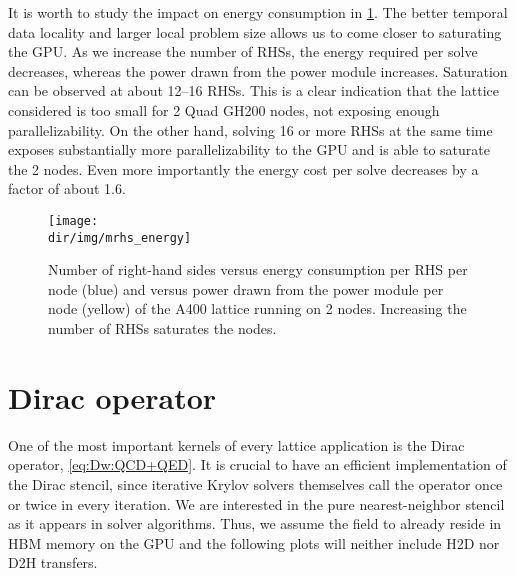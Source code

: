 It is worth to study the impact on energy consumption in \cref{fig:mrhs:energy}.
The better temporal data locality and larger local problem size allows us to come closer to saturating the GPU.
As we increase the number of RHSs, the energy required per solve decreases, whereas the power drawn from the power module increases.
Saturation can be observed at about \numrange{12}{16} RHSs.
This is a clear indication that the lattice considered is too small for \num{2} Quad GH200 nodes, not exposing enough parallelizability.
On the other hand, solving \num{16} or more RHSs at the same time exposes substantially more parallelizability to the GPU and is able to saturate the \num{2} nodes.
Even more importantly the energy cost per solve decreases by a factor of about \num{1.6}.
\begin{figure}
    \centering
    \texttt{[image: \\dir/img/mrhs\_energy]}
    \caption{Number of right-hand sides versus energy consumption per RHS per node (blue) and versus power drawn from the power module per node (yellow) of the A400 lattice running on 2 nodes. Increasing the number of RHSs saturates the nodes. }
    \label{fig:mrhs:energy}
\end{figure}

\section{Dirac operator}
\label{sec:perf:dop}

One of the most important kernels of every lattice application is the Dirac operator, \cref{eq:Dw:QCD+QED}.
It is crucial to have an efficient implementation of the Dirac stencil, since iterative Krylov solvers themselves call the operator once or twice in every iteration.
We are interested in the pure nearest-neighbor stencil as it appears in solver algorithms.
Thus, we assume the field to already reside in HBM memory on the GPU and the following plots will neither include H2D nor D2H transfers.

